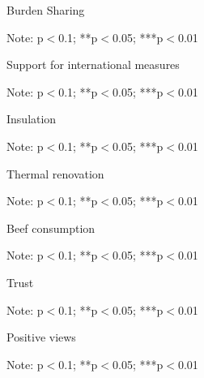 \documentclass{article}
\begin{document}
\begin{table}[h!]
	\caption{Burden Sharing}
	\begin{center}
		\scalebox{0.7}{}
	\end{center}
	{\footnotesize Note: 
	\newline *p$<$0.1; **p$<$0.05; ***p$<$0.01}
\end{table}	

\begin{table}[h!]
	\caption{Support for international measures}
	\begin{center}
		\scalebox{0.7}{}
	\end{center}
	{\footnotesize Note: 
	\newline *p$<$0.1; **p$<$0.05; ***p$<$0.01}
\end{table}	

\begin{table}[h!]
	\caption{Insulation}
	\begin{center}
		\scalebox{0.7}{}
	\end{center}
	{\footnotesize Note: 
	\newline *p$<$0.1; **p$<$0.05; ***p$<$0.01}
\end{table}	

\begin{table}[h!]
	\caption{Thermal renovation}
	\begin{center}
		\scalebox{0.7}{}
	\end{center}
	{\footnotesize Note: 
	\newline *p$<$0.1; **p$<$0.05; ***p$<$0.01}
\end{table}	

\begin{table}[h!]
	\caption{Beef consumption}
	\begin{center}
		\scalebox{0.7}{}
	\end{center}
	{\footnotesize Note: 
	\newline *p$<$0.1; **p$<$0.05; ***p$<$0.01}
\end{table}	

\begin{table}[h!]
	\caption{Trust}
	\begin{center}
		\scalebox{0.7}{}
	\end{center}
	{\footnotesize Note: 
	\newline *p$<$0.1; **p$<$0.05; ***p$<$0.01}
\end{table}	

\begin{table}[h!]
	\caption{Positive views}
	\begin{center}
		\scalebox{0.7}{}
	\end{center}
	{\footnotesize Note: 
	\newline *p$<$0.1; **p$<$0.05; ***p$<$0.01}
\end{table}	
\end{document}
